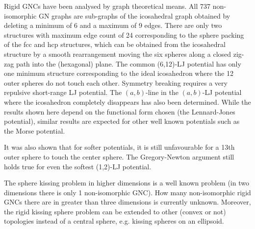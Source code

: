 Rigid \acp{GNC} have been analysed by graph theoretical means. All 737
non-isomorphic \ac{GN} graphs are sub-graphs of the icosahedral graph obtained by
deleting a minimum of 6 and a maximum of 9 edges. There are only two structures
with maximum edge count of 24 corresponding to the sphere packing of the
\ac{fcc} and \ac{hcp} structures, which can be obtained from the icosahedral
structure by a smooth rearrangement moving the six spheres along a closed
zig-zag path into the (hexagonal) plane. The common (6,12)-\ac{LJ} potential has
only one minimum structure corresponding to the ideal icosahedron where the 12
outer spheres do not touch each other. Symmetry breaking requires a very
repulsive short-range LJ potential. The $(a,b)$-line in the $(a,b)$-\ac{LJ}
potential where the icosahedron completely disappears has also been determined.
While the results shown here depend on the functional form chosen (the
Lennard-Jones potential), similar results are expected for other well known
potentials such as the Morse potential.

It was also shown that for softer potentials, it is still unfavourable for a
13th outer sphere to touch the center sphere. The Gregory-Newton argument still
holds true for even the softest (1,2)-\ac{LJ} potential.

The sphere kissing problem in higher dimensions is a well known
problem\autocite{Conway_SpherePackingsLattices_1999} (in two dimensions there is
only 1 non-isomorphic \ac{GNC}). How many non-isomorphic rigid \acp{GNC} there
are in greater than three dimensions is currently unknown. Moreover, the rigid
kissing sphere problem can be extended to other (convex or not) topologies
instead of a central sphere, e.g. kissing spheres on an ellipsoid.
